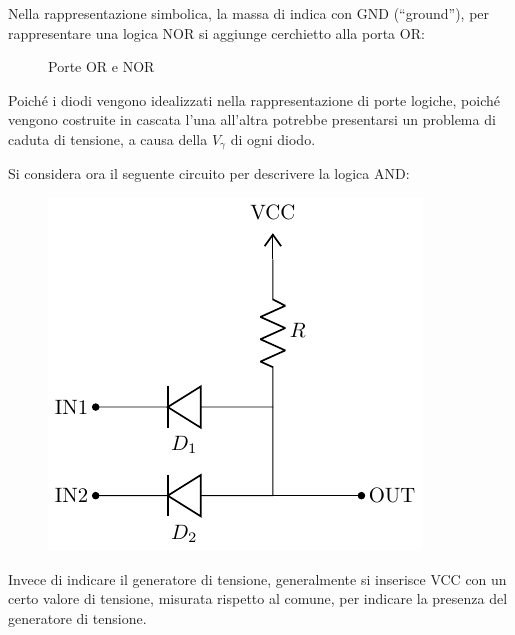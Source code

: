 \documentclass{article}
\numberwithin{equation}{subsection}
\begin{document}
Nella rappresentazione simbolica, la massa di indica con GND (``ground''), per rappresentare una logica NOR si aggiunge cerchietto alla porta OR:
\begin{figure}[H]%
    \centering
    \qquad
    \caption{Porte OR e NOR}
    \label{fig:porte-or-nor}
\end{figure}

Poiché i diodi vengono idealizzati nella rappresentazione di porte logiche, poiché vengono costruite in cascata l'una all'altra potrebbe presentarsi 
un problema di caduta di tensione, a causa della $V_{\gamma}$ di ogni diodo. 

Si considera ora il seguente circuito per descrivere la logica AND:
\begin{figure}[H]%
    \centering
    \includegraphics{circuito-and.pdf}%
    \label{fig:circuito-and}
\end{figure}
Invece di indicare il generatore di tensione, generalmente si inserisce VCC con un certo valore di tensione, misurata rispetto al comune, 
per indicare la presenza del generatore di tensione. 
\end{document}
